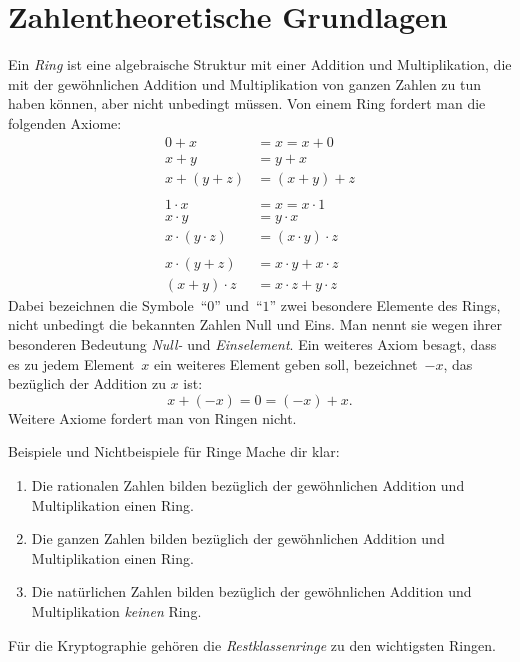 \documentclass{zirkelblatt}
\newcommand{\head}[1]{\section*{\rmfamily #1}}%
\begin{document}


\head{Zahlentheoretische Grundlagen}

Ein \emph{Ring} ist eine algebraische Struktur mit einer Addition und
Multiplikation, die mit der gewöhnlichen Addition und Multiplikation von ganzen
Zahlen zu tun haben können, aber nicht unbedingt müssen. Von einem Ring fordert
man die folgenden Axiome:
\begin{align*}
    0 + x &= x = x + 0 \\
    x + y &= y + x \\
    x + (y + z) &= (x + y) + z \\\\
    1 \cdot x &= x = x \cdot 1 \\
    x \cdot y &= y \cdot x \\
    x \cdot (y \cdot z) &= (x \cdot y) \cdot z \\\\
    x \cdot (y + z) &= x \cdot y + x \cdot z \\
    (x + y) \cdot z &= x \cdot z + y \cdot z
\end{align*}
Dabei bezeichnen die Symbole~"`$0$"' und~"`$1$"' zwei besondere Elemente des
Rings, nicht unbedingt die bekannten Zahlen Null und Eins. Man nennt sie wegen
ihrer besonderen Bedeutung \emph{Null-} und \emph{Einselement}. Ein weiteres
Axiom besagt, dass es zu jedem Element~$x$ ein weiteres Element geben soll,
bezeichnet~$-x$, das bezüglich der Addition zu $x$ ist:
\[ x + (-x) = 0 = (-x) + x. \]
Weitere Axiome fordert man von Ringen nicht.

\begin{aufgabe}{Beispiele und Nichtbeispiele für Ringe}
Mache dir klar:
\begin{enumerate}
\item Die rationalen Zahlen bilden bezüglich der gewöhnlichen
Addition und Multiplikation einen Ring.
\item Die ganzen Zahlen bilden bezüglich der gewöhnlichen
Addition und Multiplikation einen Ring.
\item Die natürlichen Zahlen bilden bezüglich der gewöhnlichen Addition und
Multiplikation \emph{keinen} Ring.
\end{enumerate}
Für die Kryptographie gehören die \emph{Restklassenringe} zu den wichtigsten
Ringen.
\end{aufgabe}
\end{document}
